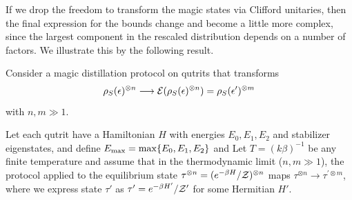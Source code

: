 \documentclass[pra,
aps,
twocolumn,
superscriptaddress,
groupedaddress,
nofootinbib,
reprint
]{revtex4-1}
\begin{document}
If we drop the freedom to transform the magic states via Clifford unitaries, then the final expression for the bounds change and become a little more complex, since the largest component in the rescaled distribution depends on a number of factors. We illustrate this by the following result.

\begin{theorem}\label{thm:no-processing}
	Consider a magic distillation protocol on qutrits that transforms
\begin{equation*}
	\rho_S(\epsilon)^{\otimes n} \longrightarrow {\mathcal E}(\rho_S(\epsilon)^{\otimes n})=\rho_S(\epsilon')^{\otimes m} 
\end{equation*}
with $n, m \gg 1$.

Let each qutrit have a Hamiltonian $H$ with energies $E_0, E_1, E_2$ and stabilizer eigenstates, and define $E_{\rm max} = \max\{E_0, E_1, E_2\}$ and 
Let $T =(k\beta)^{-1}$ be any finite temperature and assume that in the thermodynamic limit ($n,m \gg 1$), the protocol applied to the equilibrium state $\tau^{\otimes n} = (e^{-\beta H}/\mathcal{Z})^{\otimes n}$ maps $\tau^{\otimes n} \longrightarrow \tau^{\prime \otimes m}$, where we express state $\tau'$ as $\tau' = e^{-\beta H'}/\mathcal{Z}'$ for some Hermitian $H'$.


\end{theorem}
\end{document}
